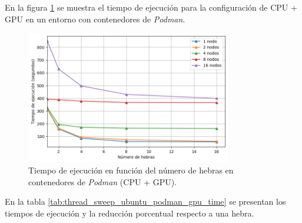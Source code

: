 En la figura \ref{fig:thread_sweep_ubuntu_podman_gpu_time} se muestra el tiempo de ejecución para la configuración de CPU + GPU en un entorno con contenedores de \textit{Podman}.

\begin{figure}[H]
    \centering
    \includegraphics[width=0.8\textwidth]{imagenes/cap5/thread_sweep_ubuntu_podman_gpu_time.png}
    \caption{Tiempo de ejecución en función del número de hebras en contenedores de \textit{Podman} (CPU + GPU).}
    \label{fig:thread_sweep_ubuntu_podman_gpu_time}
\end{figure}

En la tabla \ref{tab:thread_sweep_ubuntu_podman_gpu_time} se presentan los tiempos de ejecución y la reducción porcentual respecto a una hebra.

